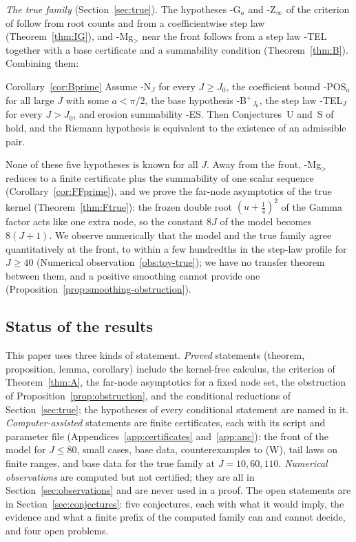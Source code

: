 \emph{The true family} (Section~\ref{sec:true}). The hypotheses \hyp{G$_a$} and \hyp{Z$_\infty$} of the criterion of
\cite{PaperI} follow from root counts and from a coefficientwise step law (Theorem~\ref{thm:IG}), and \hyp{Mg$_>$} near the front
follows from a step law \hyp{TEL} together with a base certificate and a summability condition
(Theorem~\ref{thm:B}). Combining them:

\begin{restate}{Corollary~\ref{cor:Bprime}}
Assume \hyp{N}$_J$ for every $J\ge J_0$, the coefficient bound \hyp{POS$_a$} for all large $J$ with some $a<\pi/2$, the base
hypothesis \hyp{B$^+$}$_{J_0}$, the step law \hyp{TEL$_J$} for every $J>J_0$, and erosion summability \hyp{ES}. Then
Conjectures~U and~S of \cite{PaperI} hold, and the Riemann hypothesis is equivalent to the existence of an admissible pair.
\end{restate}

None of these five hypotheses is known for all $J$. Away from the front, \hyp{Mg$_>$} reduces to a finite certificate plus the
summability of one scalar sequence (Corollary~\ref{cor:FFprime}), and we prove the far-node asymptotics of the true kernel
(Theorem~\ref{thm:Ftrue}): the frozen double root $(u+\frac14)^2$ of the Gamma factor acts like one extra node, so the constant
$8J$ of the model becomes $8(J+1)$. We observe numerically that the model and the true family agree quantitatively at the front, to
within a few hundredths in the step-law profile for $J\ge40$ (Numerical observation~\ref{obs:toy-true}); we have no transfer
theorem between them, and a positive smoothing cannot provide one (Proposition~\ref{prop:smoothing-obstruction}).

\subsection{Status of the results}\label{ssec:intro-status}

This paper uses three kinds of statement. \emph{Proved} statements (theorem, proposition, lemma, corollary) include the
kernel-free calculus, the criterion of Theorem~\ref{thm:A}, the far-node asymptotics for a fixed node set, the obstruction of
Proposition~\ref{prop:obstruction}, and the conditional reductions of Section~\ref{sec:true}; the hypotheses of every
conditional statement are named in it. \emph{Computer-assisted} statements are finite certificates, each with its script
and parameter file (Appendices~\ref{app:certificates} and~\ref{app:anc}): the front of the model for $J\le80$, small cases,
base data, counterexamples to (W), tail laws on finite ranges, and base data for the true family at $J=10,60,110$.
\emph{Numerical observations} are computed but not certified; they are all in Section~\ref{sec:observations} and are never
used in a proof. The open statements are in Section~\ref{sec:conjectures}: five conjectures, each with what it would imply,
the evidence and what a finite prefix of the computed family can and cannot decide, and four open problems.

